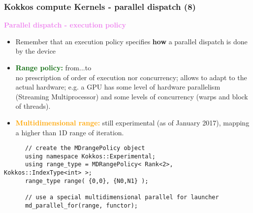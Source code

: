 \begin{frame}[fragile=singleslide]
  \frametitle{Kokkos compute Kernels - parallel dispatch (8)}

  {\Large \textcolor{violet}{\textbf{Parallel dispatch - execution policy}}}

  \begin{itemize}
  \item Remember that an execution policy specifies \textbf{how} a parallel dispatch is done by the device
  \item \textcolor{darkgreen}{\bf Range policy:} from...to\\
    no prescription of order of execution nor concurrency; allows to adapt to the actual hardware; e.g. a GPU has some level of hardware parallelism (Streaming Multiprocessor) and some levels of concurrency (warps and block of threads).
  \item \textcolor{orange}{\bf Multidimensional range:} still experimental (as of January 2017), mapping a higher than 1D range of iteration.
  \end{itemize}
  {\small
    \begin{verbatim}
      // create the MDrangePolicy object
      using namespace Kokkos::Experimental;
      using range_type = MDRangePolicy< Rank<2>, Kokkos::IndexType<int> >;
      range_type range( {0,0}, {N0,N1} );

      // use a special multidimensional parallel for launcher
      md_parallel_for(range, functor);
    \end{verbatim}
  }

\end{frame}

